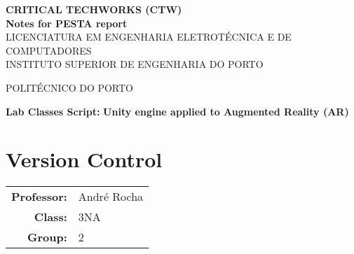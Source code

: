 \documentclass[11pt, a4paper, oneside]{article}
\date{} %
\theoremstyle{definition}
\begin{document}
\sloppy
\justifying

\pagestyle{fancy}
\fancyhead{}

\Large\textbf{CRITICAL TECHWORKS (CTW)}\\
\singlespacing
\Large\textbf{Notes for PESTA report}\\
\singlespacing
\indent\indent\indent\small{LICENCIATURA EM ENGENHARIA ELETROTÉCNICA E DE COMPUTADORES}\\
\singlespacing
\indent\indent\indent\small{INSTITUTO SUPERIOR DE ENGENHARIA DO PORTO}
\begin{spacing}{0.5}
\indent\indent\indent\small{POLITÉCNICO DO PORTO}
\end{spacing}
\singlespacing
\singlespacing
\singlespacing
\textbf{Lab Classes Script:}
\singlespacing
\indent\indent\indent\indent \textbf{Unity engine applied to Augmented Reality (AR)}


\vfill
\pagebreak
\section*{Version Control}
\begin{center}
\begin{tabular}{rl}
  \textbf{Professor:} & André Rocha\\
  \textbf{Class:} & 3NA\\
  \textbf{Group:} & 2
\end{tabular} 	
\singlespacing
\end{center}

\begin{table}[H]
	\centering
\end{table}
\end{document}
